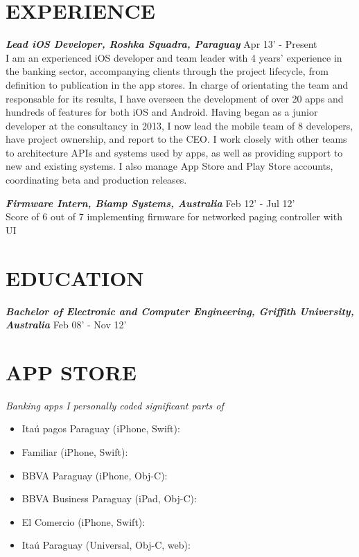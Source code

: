 \documentclass[margin]{res}
\begin{document}
\begin{resume}
\section{EXPERIENCE}   
{\sl \textbf{Lead iOS Developer, Roshka Squadra, Paraguay}} \hfill Apr 13' - Present \\
		\break I am an experienced iOS developer and team leader with 4 years' experience in the banking sector, accompanying clients through the project lifecycle, from definition to publication in the app stores.\hfill \break
                In charge of orientating the team and responsable for its results, I have overseen the development of over 20 apps and hundreds of features for both iOS and Android. Having began as a junior developer at the consultancy in 2013, I now lead the mobile team of 8 developers, have project ownership, and report to the CEO.\hfill \break
              	I work closely with other teams to architecture APIs and systems used by apps, as well as providing support to new and existing systems. I also manage App Store and Play Store accounts, coordinating beta and production releases.\hfill 
      
 {\sl \textbf{Firmware Intern, Biamp Systems, Australia}} \hfill Feb 12' - Jul 12' \\
		\break Score of 6 out of 7 implementing firmware for networked paging controller with UI
		
\section{EDUCATION}   		
 {\sl \textbf{Bachelor of Electronic and Computer Engineering, Griffith University, Australia}} \hfill Feb 08' - Nov 12' \\
	
\section{APP STORE}   
	{\sl Banking apps I personally coded significant parts of}    
	\begin{itemize}  \itemsep -2pt %
            \renewcommand\labelitemi{\tiny$\blacksquare$}
	    \item Ita{\'u} pagos Paraguay (iPhone, Swift): \hfill{}
	    \item Familiar (iPhone, Swift): \hfill{}
	    \item BBVA Paraguay (iPhone, Obj-C): \hfill{}
	    \item BBVA Business Paraguay (iPad, Obj-C): \hfill{}
	    \item El Comercio (iPhone, Swift): \hfill{}
	    \item Ita{\'u} Paraguay (Universal, Obj-C, web): \hfill{}
	\end{itemize}
                   

\end{resume}
\end{document}
